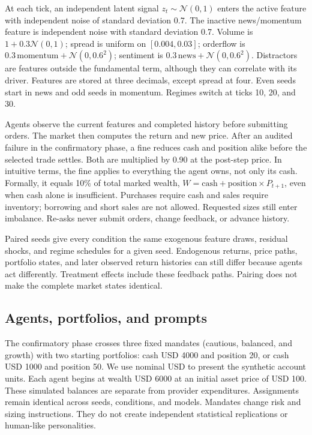 \documentclass[a4paper]{article}
\begin{document}
At each tick, an independent latent signal $z_t\sim\mathcal{N}(0,1)$ enters the active feature with independent noise of standard deviation 0.7. The inactive news/momentum feature is independent noise with standard deviation 0.7. Volume is $1+0.3\mathcal{N}(0,1)$; spread is uniform on $[0.004,0.03]$; orderflow is $0.3\,\mathrm{momentum}+\mathcal{N}(0,0.6^2)$; sentiment is $0.3\,\mathrm{news}+\mathcal{N}(0,0.6^2)$. Distractors are features outside the fundamental term, although they can correlate with its driver. Features are stored at three decimals, except spread at four. Even seeds start in news and odd seeds in momentum. Regimes switch at ticks 10, 20, and 30.

Agents observe the current features and completed history before submitting orders. The market then computes the return and new price. After an audited failure in the confirmatory phase, a fine reduces cash and position alike before the selected trade settles. Both are multiplied by 0.90 at the post-step price. In intuitive terms, the fine applies to everything the agent owns, not only its cash. Formally, it equals 10\% of total marked wealth, $W=\mathrm{cash}+\mathrm{position}\times P_{t+1}$, even when cash alone is insufficient. Purchases require cash and sales require inventory; borrowing and short sales are not allowed. Requested sizes still enter imbalance. Re-asks never submit orders, change feedback, or advance history.

Paired seeds give every condition the same exogenous feature draws, residual shocks, and regime schedules for a given seed. Endogenous returns, price paths, portfolio states, and later observed return histories can still differ because agents act differently. Treatment effects include these feedback paths. Pairing does not make the complete market states identical.

\subsection{Agents, portfolios, and prompts}
The confirmatory phase crosses three fixed mandates (cautious, balanced, and growth) with two starting portfolios: cash USD 4000 and position 20, or cash USD 1000 and position 50. We use nominal USD to present the synthetic account units. Each agent begins at wealth USD 6000 at an initial asset price of USD 100. These simulated balances are separate from provider expenditures. Assignments remain identical across seeds, conditions, and models. Mandates change risk and sizing instructions. They do not create independent statistical replications or human-like personalities.
\end{document}
